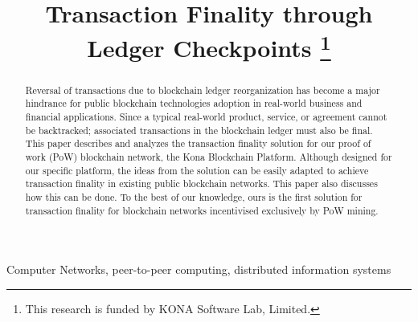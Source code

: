 \documentclass[conference]{IEEEtran}
\begin{document}
\title{Transaction Finality through Ledger Checkpoints 
	\thanks{This research is funded by KONA Software Lab, Limited.}
}

\author{
	\and		
	\and
}
\maketitle

\begin{abstract}
Reversal of transactions due to blockchain ledger reorganization has become a major hindrance for public blockchain technologies adoption in real-world business and financial applications. Since a typical real-world product, service, or agreement cannot be backtracked; associated transactions in the blockchain ledger must also be final. This paper describes and analyzes the transaction finality solution for our proof of work (PoW) blockchain network, the Kona Blockchain Platform. Although designed for our specific platform, the ideas from the solution can be easily adapted to achieve transaction finality in existing public blockchain networks. This paper also discusses how this can be done. To the best of our knowledge, ours is the first solution for transaction finality for blockchain networks incentivised exclusively by PoW mining.    
\end{abstract}

\begin{IEEEkeywords}
Computer Networks, peer-to-peer computing, distributed information systems
\end{IEEEkeywords}


\end{document}
